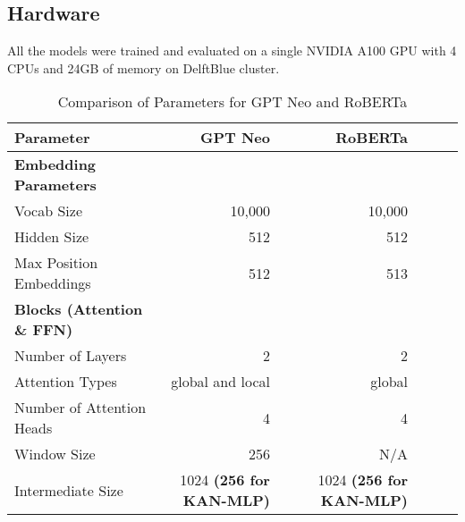 \subsection{Hardware}
All the models were trained and evaluated on a single NVIDIA A100 GPU with 4 CPUs and 24GB of memory on DelftBlue cluster.



\begin{table*}[h!]
    \centering
    \begin{tabular}{lrrrrr}
    \hline
    \toprule \textbf{Parameter} & \textbf{GPT Neo} & \textbf{RoBERTa} \\ \hline
    \toprule \textbf{Embedding Parameters} & & \\ \hline
    Vocab Size & 10,000 & 10,000 \\ \hline
    Hidden Size & 512 & 512 \\ \hline
    Max Position Embeddings & 512 & 513 \\ \hline
    \toprule \textbf{Blocks (Attention \& FFN)} & & \\ \hline
    Number of Layers & 2 & 2 \\ \hline
    Attention Types & global and local & global \\ \hline
    Number of Attention Heads & 4 & 4 \\ \hline
    Window Size & 256 & N/A \\ \hline
    Intermediate Size & 1024 \textbf{(256 for KAN-MLP)} & 1024 \textbf{(256 for KAN-MLP)} \\ \hline
    \end{tabular}
    \caption{Comparison of Parameters for GPT Neo and RoBERTa}
    \label{tab:Hyperparameters}
\end{table*}